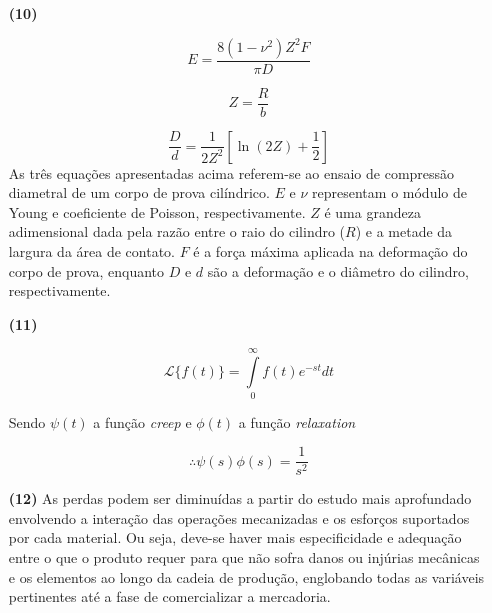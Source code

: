 \documentclass[a4paper, 12pt, brazilian]{article}
\begin{document}
\begin{itemize}
		\item[\textbf{(10)}]
		
		\begin{equation}
			E=\dfrac{8(1-\nu^{2})Z^{2}F}{\pi D}
		\end{equation}
		
		\begin{equation}
			Z=\dfrac{R}{b}
		\end{equation}
		
		\begin{equation}
			\dfrac{D}{d}=\dfrac{1}{2Z^{2}}\left[\ln (2Z)+\dfrac{1}{2}\right]
		\end{equation}
		As três equações apresentadas acima referem-se ao ensaio de compressão diametral de um corpo de prova cilíndrico. $E$ e $\nu$ representam o módulo de Young e coeficiente de Poisson, respectivamente. $Z$ é uma grandeza adimensional dada pela razão entre o raio do cilindro ($R$) e a metade da largura da área de contato. $F$ é a força máxima aplicada na deformação do corpo de prova, enquanto $D$ e $d$ são a deformação e o diâmetro do cilindro, respectivamente.
		
		\item[\textbf{(11)}]
		
		\begin{equation}
			\mathscr{L}\{f(t)\}=\int\limits_{0}^{\infty}f(t)e^{-st}dt
		\end{equation}
		
		Sendo $\psi(t)$ a função \textit{creep} e $\phi(t)$ a função \textit{relaxation}
		
		\begin{equation}
			\therefore\psi(s)\phi(s)=\dfrac{1}{s^{2}}
		\end{equation} 
		
		
		\item[\textbf{(12)}] As perdas podem ser diminuídas a partir do estudo mais aprofundado envolvendo a interação das operações mecanizadas e os esforços suportados por cada material. Ou seja, deve-se haver mais especificidade e adequação entre o que o produto requer para que não sofra danos ou injúrias mecânicas e os elementos ao longo da cadeia de produção, englobando todas as variáveis pertinentes até a fase de comercializar a mercadoria.
	\end{itemize} 
\end{document}
